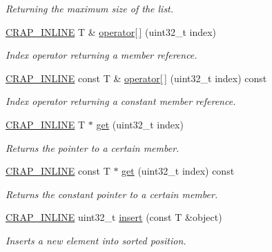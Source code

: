 \begin{DoxyCompactItemize}
\begin{DoxyCompactList}\small\item\em Returning the maximum size of the list. \end{DoxyCompactList}\item 
\hyperlink{config__x86_8h_a5a40526b8d842e7ff731509998bb0f1c}{C\+R\+A\+P\+\_\+\+I\+N\+L\+I\+N\+E} T \& \hyperlink{classcrap_1_1list_ab45db9b147db1dd2ea21ccc22e98e288}{operator\mbox{[}$\,$\mbox{]}} (uint32\+\_\+t index)
\begin{DoxyCompactList}\small\item\em Index operator returning a member reference. \end{DoxyCompactList}\item 
\hyperlink{config__x86_8h_a5a40526b8d842e7ff731509998bb0f1c}{C\+R\+A\+P\+\_\+\+I\+N\+L\+I\+N\+E} const T \& \hyperlink{classcrap_1_1list_a1929b5dafe19eebb67f2b7df474e60cd}{operator\mbox{[}$\,$\mbox{]}} (uint32\+\_\+t index) const 
\begin{DoxyCompactList}\small\item\em Index operator returning a constant member reference. \end{DoxyCompactList}\item 
\hyperlink{config__x86_8h_a5a40526b8d842e7ff731509998bb0f1c}{C\+R\+A\+P\+\_\+\+I\+N\+L\+I\+N\+E} T $\ast$ \hyperlink{classcrap_1_1list_a7f4d8eaf564aa0d9431ce10994e1f461}{get} (uint32\+\_\+t index)
\begin{DoxyCompactList}\small\item\em Returns the pointer to a certain member. \end{DoxyCompactList}\item 
\hyperlink{config__x86_8h_a5a40526b8d842e7ff731509998bb0f1c}{C\+R\+A\+P\+\_\+\+I\+N\+L\+I\+N\+E} const T $\ast$ \hyperlink{classcrap_1_1list_aba2ff9e5c5b25cee3058275aa12793eb}{get} (uint32\+\_\+t index) const 
\begin{DoxyCompactList}\small\item\em Returns the constant pointer to a certain member. \end{DoxyCompactList}\item 
\hyperlink{config__x86_8h_a5a40526b8d842e7ff731509998bb0f1c}{C\+R\+A\+P\+\_\+\+I\+N\+L\+I\+N\+E} uint32\+\_\+t \hyperlink{classcrap_1_1list_a6e93d2e1648136f378f1621e53533802}{insert} (const T \&object)
\begin{DoxyCompactList}\small\item\em Inserts a new element into sorted position. \end{DoxyCompactList}\item 

\end{DoxyCompactItemize}
